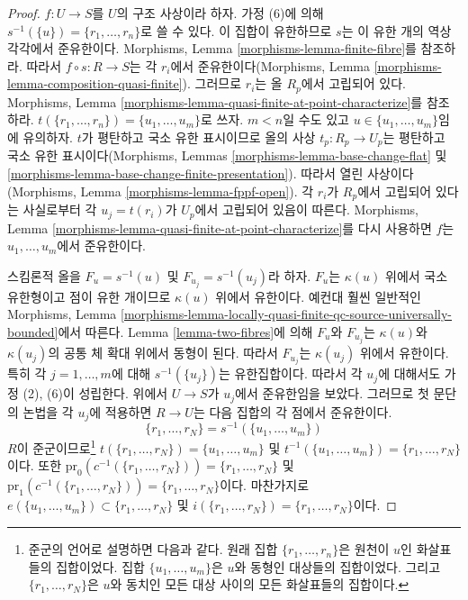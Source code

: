 \begin{proof}
$f : U \to S$를 $U$의 구조 사상이라 하자. 가정 (6)에 의해
$s^{-1}(\{u\}) = \{r_1, \ldots, r_n\}$로 쓸 수 있다. 이 집합이
유한하므로 $s$는 이 유한 개의 역상 각각에서 준유한이다. Morphisms, Lemma
\ref{morphisms-lemma-finite-fibre}를 참조하라. 따라서
$f \circ s : R \to S$는 각 $r_i$에서 준유한이다(Morphisms, Lemma
\ref{morphisms-lemma-composition-quasi-finite}). 그러므로 $r_i$는 올 $R_p$에서
고립되어 있다. Morphisms, Lemma
\ref{morphisms-lemma-quasi-finite-at-point-characterize}를 참조하라.
$t(\{r_1, \ldots, r_n\}) = \{u_1, \ldots, u_m\}$로 쓰자.
$m < n$일 수도 있고 $u \in \{u_1, \ldots, u_m\}$임에 유의하자.
$t$가 평탄하고 국소 유한 표시이므로 올의 사상 $t_p : R_p \to U_p$는
평탄하고 국소 유한 표시이다(Morphisms, Lemmas
\ref{morphisms-lemma-base-change-flat} 및
\ref{morphisms-lemma-base-change-finite-presentation}). 따라서 열린 사상이다
(Morphisms, Lemma \ref{morphisms-lemma-fppf-open}). 각 $r_i$가 $R_p$에서
고립되어 있다는 사실로부터 각 $u_j = t(r_i)$가 $U_p$에서 고립되어 있음이
따른다. Morphisms, Lemma
\ref{morphisms-lemma-quasi-finite-at-point-characterize}를 다시 사용하면
$f$는 $u_1, \ldots, u_m$에서 준유한이다.

\medskip\noindent
스킴론적 올을 $F_u = s^{-1}(u)$ 및 $F_{u_j} = s^{-1}(u_j)$라 하자.
$F_u$는 $\kappa(u)$ 위에서 국소 유한형이고 점이 유한 개이므로
$\kappa(u)$ 위에서 유한이다. 예컨대 훨씬 일반적인 Morphisms, Lemma
\ref{morphisms-lemma-locally-quasi-finite-qc-source-universally-bounded}에서
따른다. Lemma \ref{lemma-two-fibres}에 의해 $F_u$와 $F_{u_j}$는
$\kappa(u)$와 $\kappa(u_j)$의 공통 체 확대 위에서 동형이 된다. 따라서
$F_{u_j}$는 $\kappa(u_j)$ 위에서 유한이다. 특히 각
$j = 1, \ldots, m$에 대해 $s^{-1}(\{u_j\})$는 유한집합이다.
따라서 각 $u_j$에 대해서도 가정 (2), (6)이 성립한다. 위에서
$U \to S$가 $u_j$에서 준유한임을 보았다. 그러므로 첫 문단의 논법을
각 $u_j$에 적용하면 $R \to U$는 다음 집합의 각 점에서 준유한이다.
$$
\{r_1, \ldots, r_N\} = s^{-1}(\{u_1, \ldots, u_m\})
$$
$R$이 준군이므로\footnote{준군의 언어로 설명하면 다음과 같다.
원래 집합 $\{r_1, \ldots, r_n\}$은 원천이 $u$인 화살표들의 집합이었다.
집합 $\{u_1, \ldots, u_m\}$은 $u$와 동형인 대상들의 집합이었다.
그리고 $\{r_1, \ldots, r_N\}$은 $u$와 동치인 모든 대상 사이의 모든
화살표들의 집합이다.}
$t(\{r_1, \ldots, r_N\}) = \{u_1, \ldots, u_m\}$ 및
$t^{-1}(\{u_1, \ldots, u_m\}) = \{r_1, \ldots, r_N\}$이다. 또한
$\text{pr}_0(c^{-1}(\{r_1, \ldots, r_N\})) = \{r_1, \ldots, r_N\}$ 및
$\text{pr}_1(c^{-1}(\{r_1, \ldots, r_N\})) = \{r_1, \ldots, r_N\}$이다.
마찬가지로 $e(\{u_1, \ldots, u_m\}) \subset \{r_1, \ldots, r_N\}$ 및
$i(\{r_1, \ldots, r_N\}) = \{r_1, \ldots, r_N\}$이다.


\end{proof}
